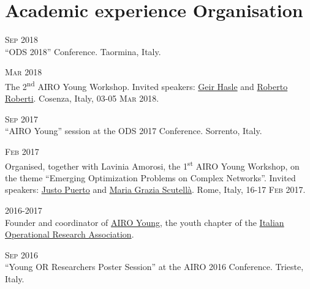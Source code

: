 \section*{Academic experience {\small Organisation}}

\begin{paracol}{2}
  \textsc{Sep 2018}
\switchcolumn
  \\
  ``ODS 2018'' Conference.
  Taormina, Italy.
\end{paracol}

\begin{paracol}{2}
  \textsc{Mar 2018}
\switchcolumn
  \\
  The 2\textsuperscript{nd} AIRO Young Workshop.
  Invited speakers: \href{https://scholar.google.it/citations?user=GXRnRZgAAAAJ&hl}{Geir Hasle} and \href{https://scholar.google.it/citations?user=pNQZmwIAAAAJ}{Roberto Roberti}.
  Cosenza, Italy, \textsc{03-05 Mar 2018}.
\end{paracol}

\begin{paracol}{2}
  \textsc{Sep 2017}
\switchcolumn
  \\
  ``AIRO Young'' session at the ODS 2017 Conference.
  Sorrento, Italy.
\end{paracol}

\begin{paracol}{2}
  \textsc{Feb 2017}
\switchcolumn
  \\
    Organised, together with Lavinia Amorosi, the 1\textsuperscript{st} AIRO Young Workshop, on the theme ``Emerging Optimization Problems on Complex Networks''.
    Invited speakers: \href{http://scholar.google.com/citations?user=koF66usAAAAJ}{Justo Puerto} and \href{http://scholar.google.com/citations?user=PcGjfV8AAAAJ}{Maria Grazia Scutellà}.
    Rome, Italy, \textsc{16-17 Feb 2017}.
\end{paracol}

\begin{paracol}{2}
  \textsc{2016-2017}
\switchcolumn
  \\
  Founder and coordinator of \href{http://airoyoung.org}{AIRO Young}, the youth chapter of the \href{http://www.airo.org}{Italian Operational Research Association}.
\end{paracol}

\begin{paracol}{2}
  \textsc{Sep 2016}
\switchcolumn
  \\
  ``Young OR Researchers Poster Session'' at the AIRO 2016 Conference.
  Trieste, Italy.
\end{paracol}

